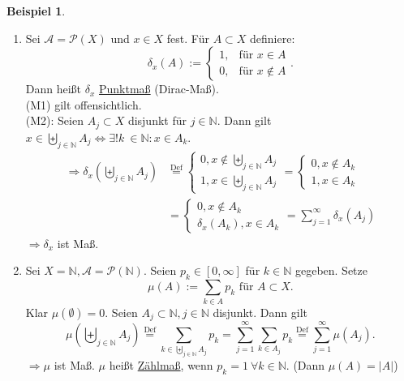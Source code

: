 \documentclass[a4paper]{scrreprt}
\newcommand{\PowerSet}{\mathcal{P}}
\newcommand{\N}{\mathbb{N}}
\newcommand{\bigdcup}{\biguplus}
\newcommand{\jlabel}[1]{\label{j_#1}}
\theoremstyle{plain}
\theoremstyle{definition}
\newtheorem{expl}[thm]{Beispiel}
\begin{document}
{{\jlabel{Bsp 1.13}
\begin{expl}
    \begin{enumerate}
        \item Sei $\mathcal{A} = \PowerSet(X)$ und $x \in X$ fest. Für $A \subset X$ definiere:
            \begin{displaymath}
                \delta_x(A) := \begin{cases} 1, & \mbox{für } x \in A \\ 0, & \mbox{für } x \notin A \end{cases}.
            \end{displaymath}
            Dann heißt $\delta_x$ \uline{Punktmaß} (Dirac-Maß).\\
            (M1) gilt offensichtlich.\\
            (M2): Seien $A_j \subset X$ disjunkt für $j \in \N$. Dann gilt $x \in \bigdcup_{j \in \N} A_j \Leftrightarrow \exists! k\ \in \N: x\in A_k$.
            \begin{displaymath}
                \begin{split}
                    \Rightarrow \delta_x(\bigdcup_{j \in \N} A_j) &\overset{\text{Def}}{=} \begin{cases} 0, x \notin \bigdcup_{j \in \N} A_j \\ 1, x\in \bigdcup_{j \in \N} A_j \end{cases} = \begin{cases} 0, x \notin A_k\\ 1, x\in A_k \end{cases} \\
                    &= \begin{cases}0, x\notin A_k\\ \delta_x(A_k), x \in A_k\end{cases} = \sum_{j=1}^\infty \delta_x(A_j)
                \end{split}
            \end{displaymath}
            $\Rightarrow \delta_x$ ist Maß.
            
        \item
            Sei $X = \N, \mathcal{A} = \PowerSet(\N)$. Seien $p_k \in [0,\infty]$ für $k\in\N$ gegeben. Setze 
            \begin{displaymath}
                \mu(A) := \sum_{k \in A} p_k\text{ für }A \subset X. 
            \end{displaymath}
            Klar $\mu(\emptyset) = 0$. Seien $A_j \subset \N, j\in\N$ disjunkt. Dann gilt
            \begin{displaymath}
                \mu \left (\bigdcup_{j\in\N} A_j \right) \overset{\text{Def}}{=} \sum_{k \in \bigdcup_{j\in\N} A_j} p_k = \sum_{j=1}^\infty \sum_{k\in A_j} p_k \overset{\text{Def}}{=} \sum_{j=1}^\infty \mu(A_j).
            \end{displaymath}
            $\Rightarrow \mu$ ist Maß. $\mu$ heißt \uline{Zählmaß}, wenn $p_k =1 \ \forall k\in \N$. (Dann $\mu(A) = |A|$)


\end{enumerate}
\end{expl}}}
\end{document}
